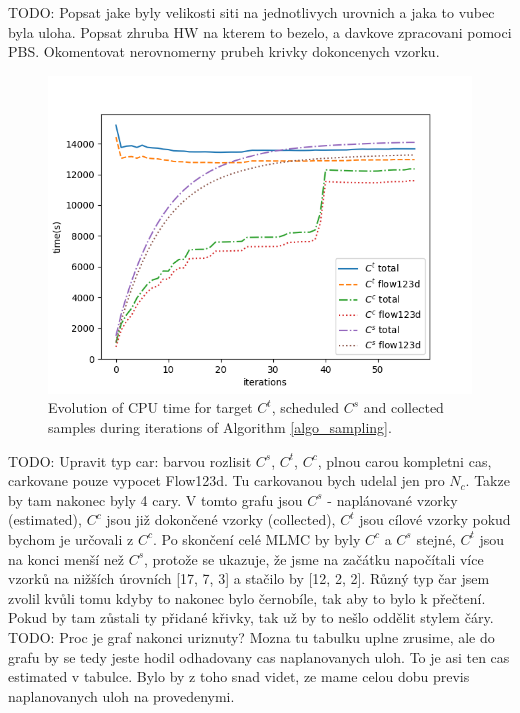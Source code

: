 \documentclass{article}
\def\todo#1{{\color{red}TODO: #1}}
\begin{document}
\todo{Popsat jake byly velikosti siti na jednotlivych urovnich a jaka to vubec byla uloha. Popsat zhruba HW na kterem to bezelo, a davkove zpracovani pomoci PBS. Okomentovat nerovnomerny prubeh krivky dokoncenych vzorku.}
\begin{figure}[H]
\centering
\includegraphics[width=\textwidth]{time_1.png}
\caption{Evolution of CPU time for target $C^t$, scheduled $C^s$ and collected samples during iterations of Algorithm \ref{algo_sampling}.}
\label{fig:n_l_time}
\end{figure}
\todo{Upravit typ car: barvou rozlisit $C^s$, $C^t$, $C^c$, plnou carou kompletni cas, carkovane pouze vypocet Flow123d. Tu carkovanou bych udelal jen pro $N_c$. Takze by tam nakonec byly 4 cary.}
V tomto grafu jsou $C^s$ - naplánované vzorky (estimated), $C^c$ jsou již dokončené vzorky (collected), $C^t$ jsou cílové vzorky pokud bychom je určovali z $C^c$. Po skončení celé MLMC by byly $C^c$ a $C^s$ stejné, $C^t$ jsou na konci menší než $C^s$, protože se ukazuje, že jsme na začátku napočítali více vzorků na nižších úrovních [17, 7, 3] a stačilo by [12, 2, 2]. Různý typ čar jsem zvolil kvůli tomu kdyby to nakonec bylo černobíle, tak aby to bylo k přečtení. Pokud by tam zůstali ty přidané křivky, tak už by to nešlo oddělit stylem čáry. 
\todo{Proc je graf nakonci uriznuty? Mozna tu tabulku uplne zrusime, ale do grafu by se tedy jeste hodil odhadovany cas naplanovanych uloh. To je asi ten cas estimated v tabulce.  Bylo by z toho snad videt, ze mame celou dobu previs naplanovanych uloh na provedenymi.}
\end{document}
